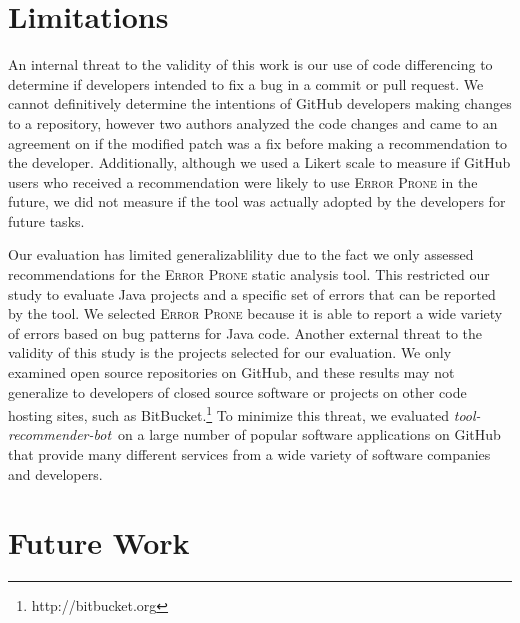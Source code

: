 \documentclass[sigconf,review,anonymous]{acmart}
\newcommand{\tool}{\textsl{tool-recommender-bot}}
\begin{document}
\section{Limitations}

An internal threat to the validity of this work is our use of code differencing to determine if developers intended to fix a bug in a commit or pull request. We cannot definitively determine the intentions of GitHub developers making changes to a repository, however two authors analyzed the code changes and came to an agreement on if the modified patch was a fix before making a recommendation to the developer. Additionally, although we used a Likert scale to measure if GitHub users who received a recommendation were likely to use \textsc{Error Prone} in the future, we did not measure if the tool was actually adopted by the developers for future tasks.

Our evaluation has limited generalizablility due to the fact we only assessed recommendations for the \textsc{Error Prone} static analysis tool. This restricted our study to evaluate Java projects and a specific set of errors that can be reported by the tool. We selected \textsc{Error Prone} because it is able to report a wide variety of errors based on bug patterns for Java code. Another external threat to the validity of this study is the projects selected for our evaluation. We only examined open source repositories on GitHub, and these results may not generalize to developers of closed source software or projects on other code hosting sites, such as BitBucket.\footnote{http://bitbucket.org} To minimize this threat, we evaluated \tool~on a large number of popular software applications on GitHub that provide many different services from a wide variety of software companies and developers. 

\section{Future Work}
\end{document}
